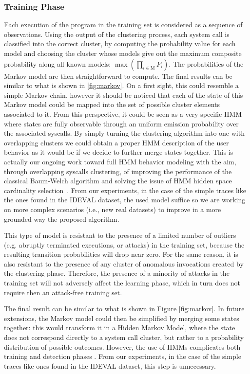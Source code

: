 \subsubsection{Training Phase}
Each execution of the program in the training set is considered as a
sequence of observations. Using the output of the clustering process,
each system call is classified into the correct cluster, by computing the
probability value for each model and choosing the cluster whose models
give out the maximum composite probability along all known models:
$\max(\prod_{i \in \mathrm{M}}{P_i})$. The probabilities of the Markov
model are then straightforward to compute. The final results can be
similar to what is shown in \ref{fig:markov}. On a first sight, this
could resemble a simple Markov chain, however it should be noticed
that each of the state of this Markov model could be mapped into the
set of possible cluster elements associated to it. From this
perspective, it could be seen as a very specific \ac{HMM}
where states are fully observable through an uniform emission
probability over the associated syscalls. By simply turning the
clustering algorithm into one with overlapping clusters we could
obtain a proper \ac{HMM} description of the user behavior
as it would be if we decide to further merge states together. This is
actually our ongoing work toward full \ac{HMM} behavior
modeling with the aim, through overlapping syscalls clustering, of
improving the performance of the classical Baum-Welch algorithm and
solving the issue of \ac{HMM} hidden space cardinality
selection~\citep{rabiner}. From our experiments, in the case of the
simple traces like the ones found in the \ac{IDEVAL}
dataset, the used model suffice so we are working on more complex
scenarios (i.e., new real datasets) to improve in a more grounded way
the proposed algorithm.

This type of model is resistant to the presence of a limited number of
outliers (e.g. abruptly terminated executions, or attacks) in the
training set, because the resulting transition probabilities will drop
near zero. For the same reason, it is also resistant to the presence
of any cluster of anomalous invocations created by the clustering
phase. Therefore, the presence of a minority of attacks in the
training set will not adversely affect the learning phase, which in
turn does not require then an attack-free training set.

The final result can be similar to what is shown in Figure
\ref{fig:markov}. In future extensions, the Markov model could then be
simplified by merging some states together: this would transform it in
a Hidden Markov Model, where the state does not correspond directly to
a system call cluster, but rather to a probability distribution of
possible outcomes. However, the use of \acp{HMM}
complicates both training and detection phases \citep{rabiner}. From
our experiments, in the case of the simple traces like ones found in
the \ac{IDEVAL} dataset, this step is unnecessary.

